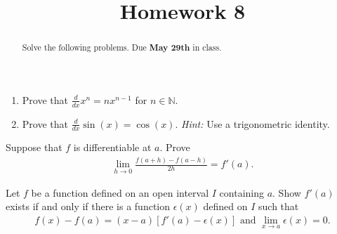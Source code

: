\documentclass{ximera}
\begin{document}
    \title{Homework 8}
    \begin{abstract} Solve the following problems.  Due \textbf{May 29th} in class. \end{abstract}
    \maketitle

\begin{exercise}
\begin{enumerate}
    \item Prove that $\frac{d}{dx}x^n = nx^{n-1}$ for $n \in \mathbb{N}$.
    \item Prove that $\frac{d}{dx} \sin(x) = \cos(x)$.  \textit{Hint:} Use a trigonometric identity.
\end{enumerate}
\end{exercise}


\begin{exercise}
    Suppose that $f$ is differentiable at $a$.  Prove
    \begin{align*}
        \lim\limits_{h\to 0} \frac{f(a+h) - f(a-h)}{2h} = f'(a).
    \end{align*}
\end{exercise}

\begin{exercise}
    Let $f$ be a function defined on an open interval $I$ containing $a$.  Show $f'(a)$ exists if and only if there is a function $\epsilon(x)$ defined on $I$ such that
    \begin{align*}
        f(x)- f(a) = (x-a)[f'(a)-\epsilon(x)] \text{ and } \lim\limits_{x\to a} \epsilon(x) = 0.
    \end{align*}
\end{exercise}
\end{document}

